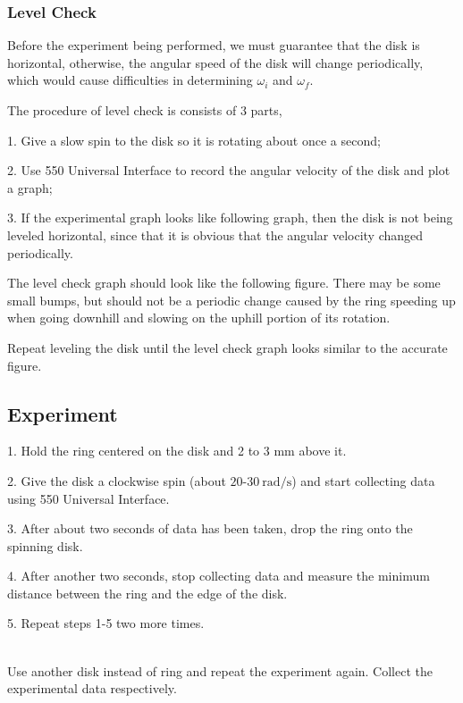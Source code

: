 \documentclass[12pt]{article}
\begin{document}
	\subsubsection{Level Check}
	Before the experiment being performed, we must guarantee that the disk is horizontal, otherwise, the angular speed of the disk will change periodically, which would cause difficulties in determining $\omega_i$ and $\omega_f$. \par 
	The procedure of level check is consists of 3 parts, \par 
	1. Give a slow spin to the disk so it is rotating about once a second; \par 
	2. Use 550 Universal Interface to record the angular velocity of the disk and plot a graph; \par 
	3. If the experimental graph looks like following graph, then the disk is not being leveled horizontal, since that it is obvious that the angular velocity changed periodically.\par 
	\begin{figure}[H]
		\centering
	\end{figure} 
	The level check graph should look like the following figure. There may be some small bumps, but should not be a periodic change caused by the ring speeding up when going downhill and slowing on the uphill portion of its rotation. \par 
	\begin{figure}[H]
		\centering
	\end{figure} 
	Repeat leveling the disk until the level check graph looks similar to the accurate figure.\par 
	\subsection{Experiment}
	1. Hold the ring centered on the disk and 2 to 3 mm above it.\par 
	2. Give the disk a clockwise spin (about $20$-$\SI{30}{\radian/\second}$) and start collecting data using 550 Universal Interface. \par 
	3. After about two seconds of data has been taken, drop the ring onto the spinning disk.\par
	4. After another two seconds, stop collecting data and measure the minimum distance between the ring and the edge of the disk.\par
	5. Repeat steps 1-5 two more times.\par 
	~\\
	Use another disk instead of ring and repeat the experiment again. Collect the experimental data respectively.\par 
	
\end{document}
